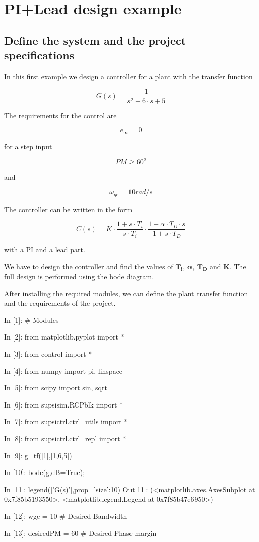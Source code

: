 \section{PI+Lead design example}

\subsection{Define the system and the project specifications}

In this first example we design a controller for a plant with the transfer 
function
 
$$
G(s)=\frac{1}{s^2 + 6\cdot s + 5}
$$
 
The requirements for the control are
 
$$
e_{\infty} = 0
$$ 
 
for a step input
 
$$
PM\geq60^o
$$
 
and
 
$$
\omega_{gc} = 10rad/s
$$

The controller can be written in the form

$$
C(s) = K \cdot \frac{1+s \cdot T_i}{s \cdot T_i} \cdot \frac{1+\alpha \cdot T_D 
\cdot s}{1+ s \cdot T_D}
$$

with a PI and a lead part.

We have to design the controller and find the values of $\mathbf{T_i}$, 
$\mathbf{\alpha}$, 
$\mathbf{T_D}$ and $\mathbf{K}$. The full design is performed using the bode 
diagram.

After installing the required modules, we can define the plant transfer 
function and the requirements of the project.
 
\begin{code}
In [1]: # Modules

In [2]: from matplotlib.pyplot import *

In [3]: from control import *

In [4]: from numpy import pi, linspace

In [5]: from scipy import sin, sqrt

In [6]: from supsisim.RCPblk import *

In [7]: from supsictrl.ctrl_utils import *

In [8]: from supsictrl.ctrl_repl import *

In [9]: g=tf([1],[1,6,5])

In [10]: bode(g,dB=True);

In [11]: legend(['G(s)'],prop={'size':10})
Out[11]: 
(<matplotlib.axes.AxesSubplot at 0x7f85b5193550>,
 <matplotlib.legend.Legend at 0x7f85b47e6950>)

In [12]: wgc = 10         # Desired Bandwidth

In [13]: desiredPM = 60   # Desired Phase margin
\end{code}

